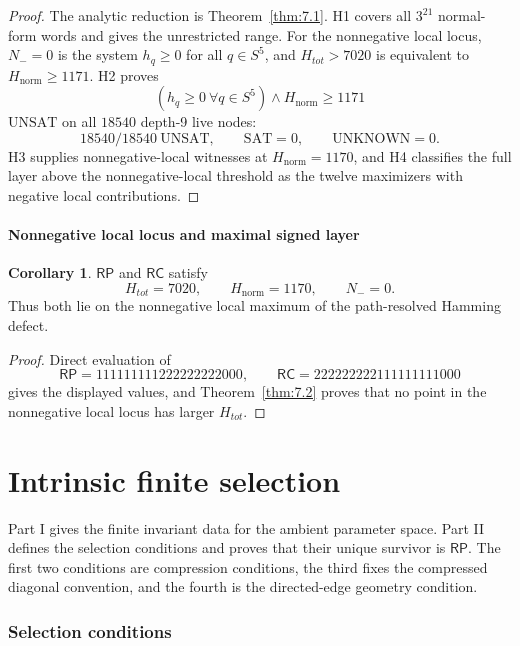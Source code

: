 \documentclass[11pt]{article}
\theoremstyle{definition}
\newtheorem{corollary}[theorem]{Corollary}
\newcommand{\RP}{\mathsf{RP}}
\newcommand{\RC}{\mathsf{RC}}
\begin{document}
\begin{proof}
The analytic reduction is Theorem~\ref{thm:7.1}. H1 covers all
\(3^{21}\) normal-form words and gives the unrestricted range. For the
nonnegative local locus, \(N_-=0\) is the system \(h_q\ge0\) for all \(q\in S^5\),
and \(H_{tot}>7020\) is equivalent to \(H_{\mathrm{norm}}\ge1171\). H2 proves \[
(h_q\ge0\ \forall q\in S^5)\wedge H_{\mathrm{norm}}\ge1171
\] \(\mathrm{UNSAT}\) on all \(18540\) depth-9 live nodes: \[
18540/18540\ \mathrm{UNSAT},
\qquad \mathrm{SAT}=0,
\qquad \mathrm{UNKNOWN}=0.
\] H3 supplies nonnegative-local witnesses at \(H_{\mathrm{norm}}=1170\), and H4 classifies the
full layer above the nonnegative-local threshold as the twelve maximizers with negative local contributions.
\end{proof}

\subsection{Nonnegative local locus and maximal signed layer}\label{h-nonnegative-local-locus-maximal-layer}\label{rp-and-rc-on-the-nonnegative-local-locus}

\begin{corollary}
\label{cor:7.3}
\(\RP\) and \(\RC\) satisfy \[
H_{tot}=7020,
\qquad H_{\mathrm{norm}}=1170,
\qquad N_-=0.
\] Thus both lie on the nonnegative local maximum of the path-resolved Hamming defect.
\end{corollary}

\begin{proof}
Direct evaluation of \[
\RP=111111111222222222000,
\qquad
\RC=222222222111111111000
\] gives the displayed values, and Theorem~\ref{thm:7.2} proves that no point in the nonnegative local locus
has larger \(H_{tot}\).
\end{proof}


\clearpage
\part{Intrinsic finite selection}

Part I gives the finite invariant data for the ambient parameter space.  Part II
defines the selection conditions and proves that their unique survivor is \(\RP\).  The
first two conditions are compression conditions, the third fixes the compressed
diagonal convention, and the fourth is the directed-edge geometry condition.

\section{Selection conditions}\label{selection-conditions}
\end{document}
